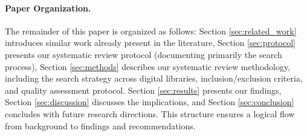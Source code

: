 
\paragraph{Paper Organization.}
The remainder of this paper is organized as follows: Section \ref{sec:related_work} introduces
similar work already present in the literature, Section \ref{sec:protocol} presents our systematic
review protocol (documenting primarily the search process), Section \ref{sec:methods} describes our
systematic review methodology, including the search strategy across digital libraries,
inclusion/exclusion criteria, and quality assessment protocol. Section \ref{sec:results} presents
our findings, Section \ref{sec:discussion} discusses the implications, and Section
\ref{sec:conclusion} concludes with future research directions. This structure ensures a logical
flow from background to findings and recommendations. 

